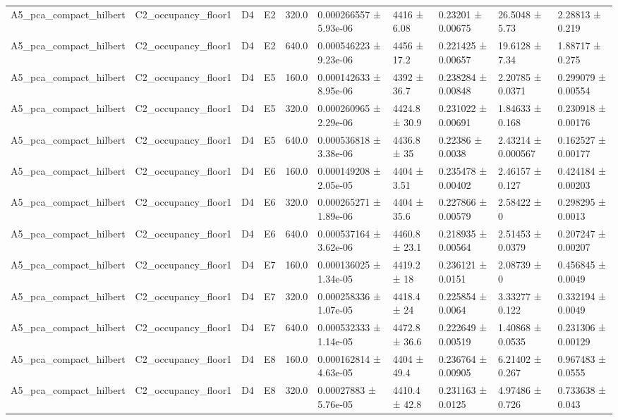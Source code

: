 \begin{table}
\begin{tabular}{llllllllll}
A5\_pca\_compact\_hilbert & C2\_occupancy\_floor1 & D4 & E2 & 320.0 & 0.000266557 ± 5.93e-06 & 4416 ± 6.08 & 0.23201 ± 0.00675 & 26.5048 ± 5.73 & 2.28813 ± 0.219 \\
A5\_pca\_compact\_hilbert & C2\_occupancy\_floor1 & D4 & E2 & 640.0 & 0.000546223 ± 9.23e-06 & 4456 ± 17.2 & 0.221425 ± 0.00657 & 19.6128 ± 7.34 & 1.88717 ± 0.275 \\
A5\_pca\_compact\_hilbert & C2\_occupancy\_floor1 & D4 & E5 & 160.0 & 0.000142633 ± 8.95e-06 & 4392 ± 36.7 & 0.238284 ± 0.00848 & 2.20785 ± 0.0371 & 0.299079 ± 0.00554 \\
A5\_pca\_compact\_hilbert & C2\_occupancy\_floor1 & D4 & E5 & 320.0 & 0.000260965 ± 2.29e-06 & 4424.8 ± 30.9 & 0.231022 ± 0.00691 & 1.84633 ± 0.168 & 0.230918 ± 0.00176 \\
A5\_pca\_compact\_hilbert & C2\_occupancy\_floor1 & D4 & E5 & 640.0 & 0.000536818 ± 3.38e-06 & 4436.8 ± 35 & 0.22386 ± 0.0038 & 2.43214 ± 0.000567 & 0.162527 ± 0.00177 \\
A5\_pca\_compact\_hilbert & C2\_occupancy\_floor1 & D4 & E6 & 160.0 & 0.000149208 ± 2.05e-05 & 4404 ± 3.51 & 0.235478 ± 0.00402 & 2.46157 ± 0.127 & 0.424184 ± 0.00203 \\
A5\_pca\_compact\_hilbert & C2\_occupancy\_floor1 & D4 & E6 & 320.0 & 0.000265271 ± 1.89e-06 & 4404 ± 35.6 & 0.227866 ± 0.00579 & 2.58422 ± 0 & 0.298295 ± 0.0013 \\
A5\_pca\_compact\_hilbert & C2\_occupancy\_floor1 & D4 & E6 & 640.0 & 0.000537164 ± 3.62e-06 & 4460.8 ± 23.1 & 0.218935 ± 0.00564 & 2.51453 ± 0.0379 & 0.207247 ± 0.00207 \\
A5\_pca\_compact\_hilbert & C2\_occupancy\_floor1 & D4 & E7 & 160.0 & 0.000136025 ± 1.34e-05 & 4419.2 ± 18 & 0.236121 ± 0.0151 & 2.08739 ± 0 & 0.456845 ± 0.0049 \\
A5\_pca\_compact\_hilbert & C2\_occupancy\_floor1 & D4 & E7 & 320.0 & 0.000258336 ± 1.07e-05 & 4418.4 ± 24 & 0.225854 ± 0.0064 & 3.33277 ± 0.122 & 0.332194 ± 0.0049 \\
A5\_pca\_compact\_hilbert & C2\_occupancy\_floor1 & D4 & E7 & 640.0 & 0.000532333 ± 1.14e-05 & 4472.8 ± 36.6 & 0.222649 ± 0.00519 & 1.40868 ± 0.0535 & 0.231306 ± 0.00129 \\
A5\_pca\_compact\_hilbert & C2\_occupancy\_floor1 & D4 & E8 & 160.0 & 0.000162814 ± 4.63e-05 & 4404 ± 49.4 & 0.236764 ± 0.00905 & 6.21402 ± 0.267 & 0.967483 ± 0.0555 \\
A5\_pca\_compact\_hilbert & C2\_occupancy\_floor1 & D4 & E8 & 320.0 & 0.00027883 ± 5.76e-05 & 4410.4 ± 42.8 & 0.231163 ± 0.0125 & 4.97486 ± 0.726 & 0.733638 ± 0.043 \\

\end{tabular}
\end{table}
